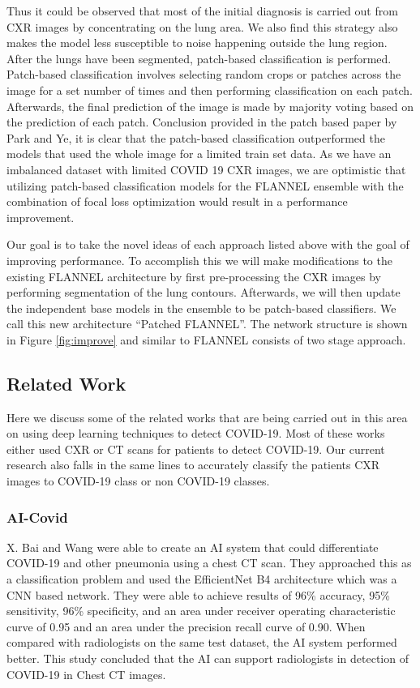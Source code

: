 \documentclass{sigkddExp}
\begin{document}
Thus it could be observed that most of the initial diagnosis is carried out from
CXR images by concentrating on the lung area. We also find this strategy also
makes the model less susceptible to noise happening outside the lung region.
After the lungs have been segmented, patch-based classification is performed.
Patch-based classification involves selecting random crops or patches across the
image for a set number of times and then performing classification on each
patch. Afterwards, the final prediction of the image is made by majority voting
based on the prediction of each patch. Conclusion provided in the patch based
paper \cite{pmid32396075} by Park and Ye, it is clear that the patch-based
classification outperformed the models that used the whole image for a limited
train set data. As we have an imbalanced dataset with limited COVID 19 CXR
images, we are optimistic that utilizing patch-based classification models for
the FLANNEL ensemble with the combination of focal loss optimization would
result in a performance improvement.

Our goal is to take the novel ideas of each approach listed above with the goal
of improving performance. To accomplish this we will make modifications to the
existing FLANNEL architecture by first pre-processing the CXR images by
performing segmentation of the lung contours. Afterwards, we will then update
the independent base models in the ensemble to be patch-based classifiers. We
call this new architecture “Patched FLANNEL”. The network structure is shown in
Figure \ref{fig:improve} and similar to FLANNEL consists of two stage approach.

\subsection{Related Work}

Here we discuss some of the related works that are being carried out in this area on using deep learning techniques to detect COVID-19. Most of these works either used CXR or CT scans for patients to detect COVID-19. Our current research also falls in the same lines to accurately classify the patients CXR images to COVID-19 class or non COVID-19 classes.

\subsubsection{AI-Covid}

X. Bai and Wang \cite{pmid32339081} were able to create an AI system that could
differentiate COVID-19 and other pneumonia using a chest CT scan. They
approached this as a classification problem and used the EfficientNet B4
architecture which was a CNN based network. They were able to achieve results of
96\% accuracy, 95\% sensitivity, 96\% specificity, and an area under receiver
operating characteristic curve of 0.95 and an area under the precision recall
curve of 0.90. When compared with radiologists on the same test dataset, the AI
system performed better. This study concluded that the AI can support
radiologists in detection of COVID-19 in Chest CT images.
\end{document}
